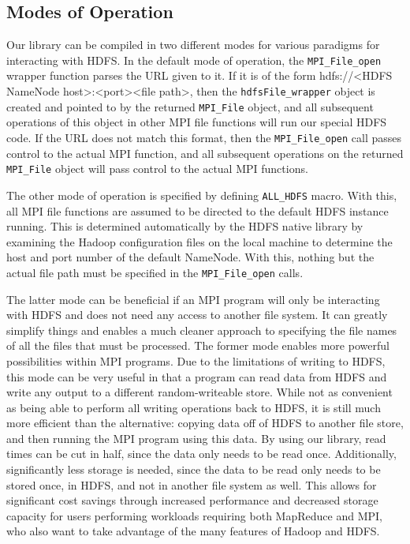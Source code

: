 \subsection{Modes of Operation}
Our library can be compiled in two different modes for various paradigms for interacting with HDFS. In the default mode of operation, the \texttt{MPI\_File\_open} wrapper function parses the URL given to it. If it is of the form hdfs://<HDFS NameNode host>:<port><file path>, then the \texttt{hdfsFile\_wrapper} object is created and pointed to by the returned \texttt{MPI\_File} object, and all subsequent operations of this object in other MPI file functions will run our special HDFS code. If the URL does not match this format, then the \texttt{MPI\_File\_open} call passes control to the actual MPI function, and all subsequent operations on the returned \texttt{MPI\_File} object will pass control to the actual MPI functions. 

The other mode of operation is specified by defining \texttt{ALL\_HDFS} macro. With this, all MPI file functions are assumed to be directed to the default HDFS instance running. This is determined automatically by the HDFS native library by examining the Hadoop configuration files on the local machine to determine the host and port number of the default NameNode. With this, nothing but the actual file path must be specified in the \texttt{MPI\_File\_open} calls. 

The latter mode can be beneficial if an MPI program will only be interacting with HDFS and does not need any access to another file system. It can greatly simplify things and enables a much cleaner approach to specifying the file names of all the files that must be processed. The former mode enables more powerful possibilities within MPI programs. Due to the limitations of writing to HDFS, this mode can be very useful in that a program can read data from HDFS and write any output to a different random-writeable store. While not as convenient as being able to perform all writing operations back to HDFS, it is still much more efficient than the alternative: copying data off of HDFS to another file store, and then running the MPI program using this data. By using our library, read times can be cut in half, since the data only needs to be read once. Additionally, significantly less storage is needed, since the data to be read only needs to be stored once, in HDFS, and not in another file system as well. This allows for significant cost savings through increased performance and decreased storage capacity for users performing workloads requiring both MapReduce and MPI, who also want to take advantage of the many features of Hadoop and HDFS.
